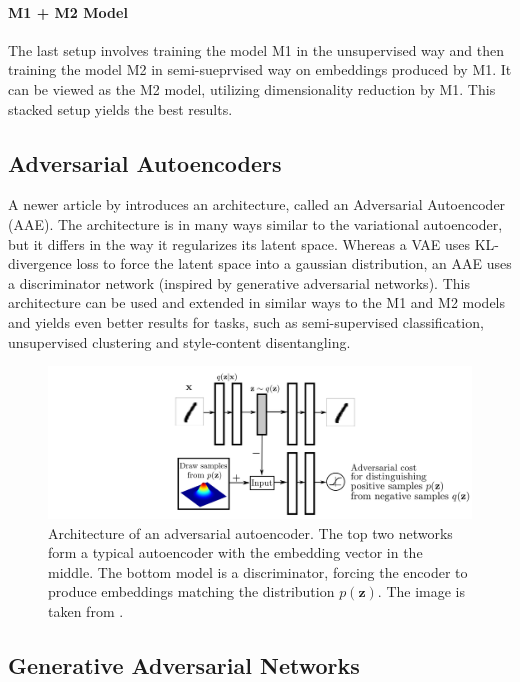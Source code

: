 \paragraph*{M1 + M2 Model}
The last setup involves training the model M1 in the unsupervised way and then training the model M2 in semi-sueprvised way on embeddings produced by M1. It can be viewed as the M2 model, utilizing dimensionality reduction by M1. This stacked setup yields the best results.


\subsection{Adversarial Autoencoders}

A newer article by \cite{AdversarialAutoencoders} introduces an architecture, called an Adversarial Autoencoder (AAE). The architecture is in many ways similar to the variational autoencoder, but it differs in the way it regularizes its latent space. Whereas a VAE uses KL-divergence loss to force the latent space into a gaussian distribution, an AAE uses a discriminator network (inspired by generative adversarial networks). This architecture can be used and extended in similar ways to the M1 and M2 models and yields even better results for tasks, such as semi-supervised classification, unsupervised clustering and style-content disentangling.

\begin{figure}[ht]
    \centering
    \includegraphics[width=145mm]{../img/aae.png}
    \caption{Architecture of an adversarial autoencoder. The top two networks form a typical autoencoder with the embedding vector in the middle. The bottom model is a discriminator, forcing the encoder to produce embeddings matching the distribution $p(\mathbf{z})$. The image is taken from \cite{AdversarialAutoencoders}.}
    \label{fig:AaeArchitecture}
\end{figure}


\subsection{Generative Adversarial Networks}


